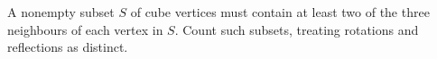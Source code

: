 A nonempty subset $ S $ of cube vertices must contain at least two of the three neighbours of each vertex in $ S $. Count such subsets, treating rotations and reflections as distinct.
